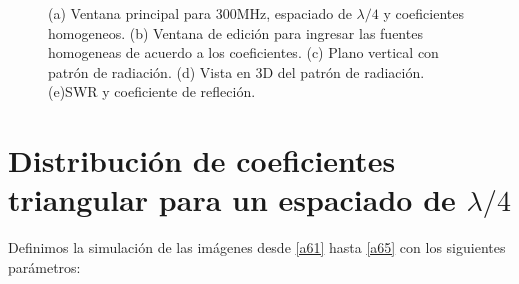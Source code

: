 \documentclass[11pt]{book}
\begin{document}
\begin{figure}[h]
	\caption{(a) Ventana principal para 300MHz, espaciado de $\lambda / 4$ y coeficientes homogeneos. (b) Ventana de edición para ingresar las fuentes homogeneas de acuerdo a los coeficientes. (c) Plano vertical con patrón de radiación. (d) Vista en 3D del patrón de radiación. (e)SWR y coeficiente de refleción.}
\end{figure}

\newpage

\section{Distribución de coeficientes triangular para un espaciado de $\lambda/4$}

Definimos la simulación de las imágenes desde \eqref{a61} hasta \eqref{a65} con los siguientes parámetros:
\end{document}
